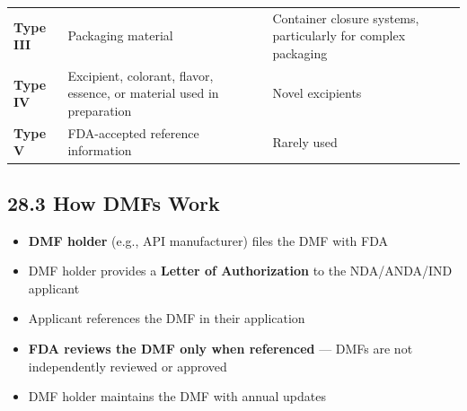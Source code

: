 \documentclass[
  11pt,
  a4paper,
]{report}
\providecommand{\tightlist}{%
  \setlength{\itemsep}{0pt}\setlength{\parskip}{0pt}}
\begin{document}
\begin{longtable}[]{@{}lll@{}}
\begin{minipage}[t]{0.21\columnwidth}
\textbf{Type III}\strut
\end{minipage} & \begin{minipage}[t]{0.32\columnwidth}\raggedright
Packaging material\strut
\end{minipage} & \begin{minipage}[t]{0.39\columnwidth}\raggedright
Container closure systems, particularly for complex packaging\strut
\end{minipage}\tabularnewline
\begin{minipage}[t]{0.21\columnwidth}\raggedright
\textbf{Type IV}\strut
\end{minipage} & \begin{minipage}[t]{0.32\columnwidth}\raggedright
Excipient, colorant, flavor, essence, or material used in
preparation\strut
\end{minipage} & \begin{minipage}[t]{0.39\columnwidth}\raggedright
Novel excipients\strut
\end{minipage}\tabularnewline
\begin{minipage}[t]{0.21\columnwidth}\raggedright
\textbf{Type V}\strut
\end{minipage} & \begin{minipage}[t]{0.32\columnwidth}\raggedright
FDA-accepted reference information\strut
\end{minipage} & \begin{minipage}[t]{0.39\columnwidth}\raggedright
Rarely used\strut
\end{minipage}\tabularnewline
\bottomrule
\end{longtable}

\hypertarget{how-dmfs-work}{%
\subsection{28.3 How DMFs Work}\label{how-dmfs-work}}

\begin{itemize}
\tightlist
\item
  \textbf{DMF holder} (e.g., API manufacturer) files the DMF with FDA
\item
  DMF holder provides a \textbf{Letter of Authorization} to the
  NDA/ANDA/IND applicant
\item
  Applicant references the DMF in their application
\item
  \textbf{FDA reviews the DMF only when referenced} --- DMFs are not
  independently reviewed or approved
\item
  DMF holder maintains the DMF with annual updates
\end{itemize}
\end{document}
